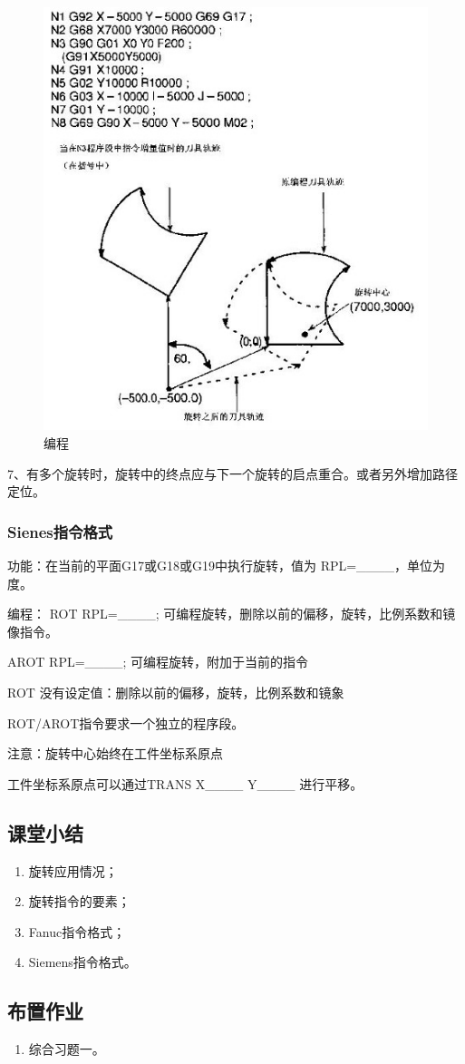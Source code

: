 \begin{figure}[h]
	\centering
	\includegraphics[width=0.7\linewidth,trim=0 0 0 0,clip]{data/image/31-3}
	\caption{编程}
	\label{fig:31-3}
\end{figure}

7、有多个旋转时，旋转中的终点应与下一个旋转的启点重合。或者另外增加路径定位。

\subsubsection{Sienes指令格式}

功能：在当前的平面G17或G18或G19中执行旋转，值为 RPL=\_\_\_\_，单位为度。

编程：    ROT RPL=\_\_\_\_;  可编程旋转，删除以前的偏移，旋转，比例系数和镜像指令。

AROT RPL=\_\_\_\_; 可编程旋转，附加于当前的指令

ROT    没有设定值：删除以前的偏移，旋转，比例系数和镜象

ROT/AROT指令要求一个独立的程序段。

注意：旋转中心始终在工件坐标系原点

工件坐标系原点可以通过TRANS X\_\_\_\_ Y\_\_\_\_ 进行平移。

\subsection{课堂小结}
\begin{enumerate}[1、]
\item 旋转应用情况；
\item 旋转指令的要素；
\item Fanuc指令格式；
\item Siemens指令格式。
\end{enumerate}

\vfill
\subsection{布置作业}
\begin{enumerate}[1、]
	\item 综合习题一。
\end{enumerate}
\vfill